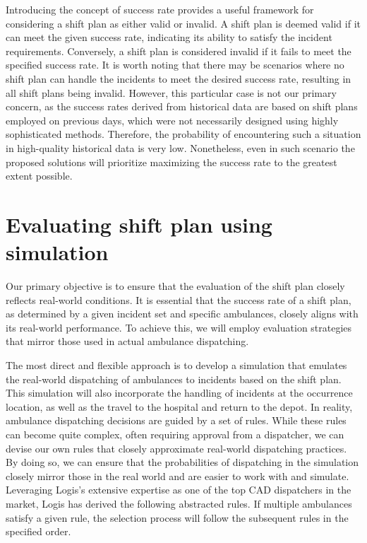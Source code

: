 Introducing the concept of success rate provides a useful framework for
considering a shift plan as either valid or invalid. A shift plan is deemed
valid if it can meet the given success rate, indicating its ability to satisfy
the incident requirements. Conversely, a shift plan is considered invalid if it
fails to meet the specified success rate. It is worth noting that there may be
scenarios where no shift plan can handle the incidents to meet the desired
success rate, resulting in all shift plans being invalid. However, this
particular case is not our primary concern, as the success rates derived from
historical data are based on shift plans employed on previous days, which were
not necessarily designed using highly sophisticated methods. Therefore, the
probability of encountering such a situation in high-quality historical data is
very low. Nonetheless, even in such scenario the proposed solutions will
prioritize maximizing the success rate to the greatest extent possible.

\newpage

\section{Evaluating shift plan using simulation}

Our primary objective is to ensure that the evaluation of the shift plan
closely reflects real-world conditions. It is essential that the success rate
of a shift plan, as determined by a given incident set and specific ambulances,
closely aligns with its real-world performance. To achieve this, we will employ
evaluation strategies that mirror those used in actual ambulance dispatching.

The most direct and flexible approach is to develop a simulation that emulates
the real-world dispatching of ambulances to incidents based on the shift plan.
This simulation will also incorporate the handling of incidents at the
occurrence location, as well as the travel to the hospital and return to the
depot. In reality, ambulance dispatching decisions are guided by a set of
rules. While these rules can become quite complex, often requiring approval
from a dispatcher, we can devise our own rules that closely approximate
real-world dispatching practices. By doing so, we can ensure that the
probabilities of dispatching in the simulation closely mirror those in the real
world and are easier to work with and simulate. Leveraging Logis's extensive
expertise as one of the top CAD dispatchers in the market, Logis has derived
the following abstracted rules. If multiple ambulances satisfy a given rule,
the selection process will follow the subsequent rules in the specified order.

